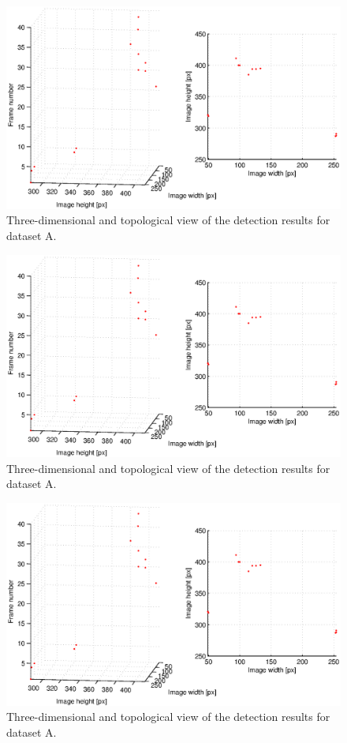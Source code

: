 \begin{figure}
	\includegraphics[width=\textwidth]{images/fig_results_detector_sequences_1}
	\caption{Three-dimensional and topological view of the detection results for dataset A.}
	\label{fig:results_detector_sequences_3}
\end{figure}

\begin{figure}
	\includegraphics[width=\textwidth]{images/fig_results_detector_sequences_1}
	\caption{Three-dimensional and topological view of the detection results for dataset A.}
	\label{fig:results_detector_sequences_4}
\end{figure}
\begin{figure}
	\includegraphics[width=\textwidth]{images/fig_results_detector_sequences_1}
	\caption{Three-dimensional and topological view of the detection results for dataset A.}
	\label{fig:results_detector_sequences_5}
\end{figure}			